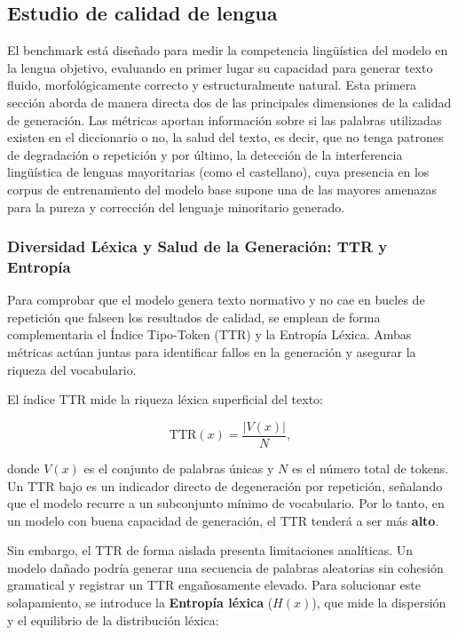 \subsection{Estudio de calidad de lengua}
\label{calidad-lengua}

El benchmark está diseñado para medir la competencia lingüística del modelo en la lengua objetivo, evaluando en primer lugar su capacidad para generar texto fluido, morfológicamente correcto y estructuralmente natural. Esta primera sección aborda de manera directa dos de las principales dimensiones de la calidad de generación. Las métricas aportan información sobre si las palabras utilizadas existen en el diccionario o no, la salud del texto, es decir, que no tenga patrones de degradación o repetición y por último, la detección de la interferencia lingüística de lenguas mayoritarias (como el castellano), cuya presencia en los corpus de entrenamiento del modelo base supone una de las mayores amenazas para la pureza y corrección del lenguaje minoritario generado.

\subsubsection{Diversidad Léxica y Salud de la Generación: TTR y Entropía}

Para comprobar que el modelo genera texto normativo y no cae en bucles de repetición que falseen los resultados de calidad, se emplean de forma complementaria el Índice Tipo-Token (TTR) y la Entropía Léxica. Ambas métricas actúan juntas para identificar fallos en la generación y asegurar la riqueza del vocabulario.

El índice TTR mide la riqueza léxica superficial del texto:

\[
\text{TTR}(x) = \frac{\lvert V(x) \rvert}{N},
\]

donde $V(x)$ es el conjunto de palabras únicas y $N$ es el número total de tokens. Un TTR bajo es un indicador directo de degeneración por repetición, señalando que el modelo recurre a un subconjunto mínimo de vocabulario. Por lo tanto, en un modelo con buena capacidad de generación, el TTR tenderá a ser más \textbf{alto}.

Sin embargo, el TTR de forma aislada presenta limitaciones analíticas. Un modelo dañado podría generar una secuencia de palabras aleatorias sin cohesión gramatical y registrar un TTR engañosamente elevado. Para solucionar este solapamiento, se introduce la \textbf{Entropía léxica} ($H(x)$), que mide la dispersión y el equilibrio de la distribución léxica:

